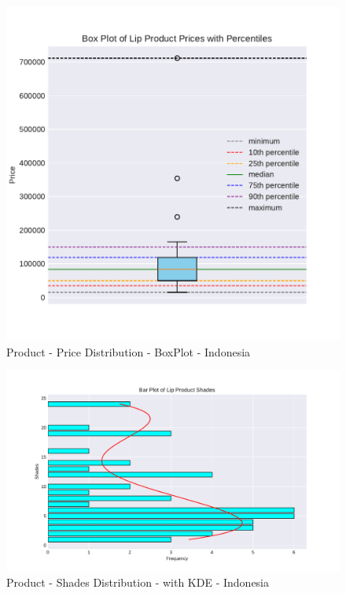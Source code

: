 \documentclass{article}
\begin{document}
\begin{center}
    \begin{figure}[htbp]
        \centering
        \includegraphics[scale=0.6]{../images/Indonesia-graphs/Box_Prices.pdf}
        \caption{Product - Price Distribution - BoxPlot - Indonesia}
        \label{Box_Prices}
    \end{figure}

    \begin{figure}[htbp]
        \centering
        \includegraphics[scale=0.6]{../images/Indonesia-graphs/KDE_Shades.pdf}
        \caption{Product - Shades Distribution - with KDE - Indonesia}
        \label{KDE_Shades}
    \end{figure}
    \restoregeometry

\end{center}
\restoregeometry
\end{document}
